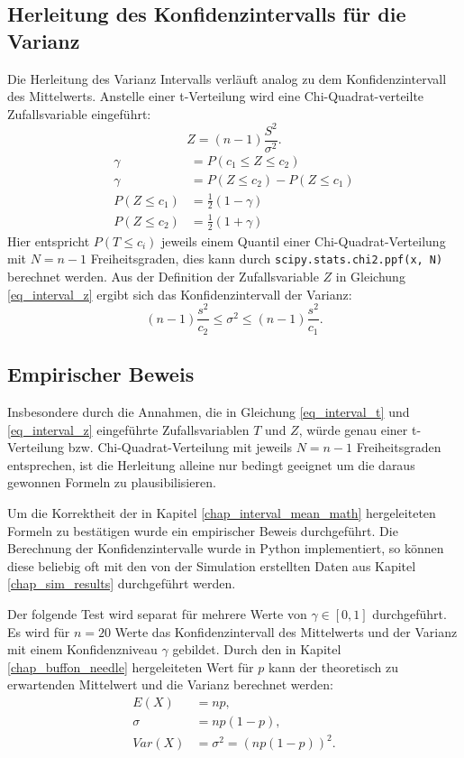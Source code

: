 \documentclass[10pt,twocolumn]{scrartcl}
\begin{document}
	\subsection{Herleitung des Konfidenzintervalls für die Varianz}
		\label{chap_interval_var_math}
		Die Herleitung des Varianz Intervalls verläuft analog zu dem Konfidenzintervall  des Mittelwerts. Anstelle einer t-Verteilung wird eine Chi-Quadrat-verteilte Zufallsvariable eingeführt:
		\begin{equation} \label{eq_interval_z}
		Z = (n-1)\frac{S^2}{\sigma^2} .
		\end{equation}
		\begin{align}
		\gamma &= P(c_1 \le Z \le c_2) \\
		\gamma &= P(Z \le c_2) - P(Z \le c_1) \nonumber \\
		P(Z \le c_1) &= \frac{1}{2} (1-\gamma) \\
		P(Z \le c_2) &= \frac{1}{2} (1+\gamma)
		\end{align}
		Hier entspricht $P(T \le c_i)$ jeweils einem Quantil einer Chi-Quadrat-Verteilung mit $N = n-1$ Freiheitsgraden, dies kann durch \texttt{scipy.stats.chi2.ppf(x, N)}\cite{scipy} berechnet werden.
		Aus der Definition der Zufallsvariable $Z$ in Gleichung \ref{eq_interval_z} ergibt sich das Konfidenzintervall der Varianz:
		\begin{equation}
		(n-1)  \frac{s^2}{c_2} \le \sigma^2 \le (n-1)  \frac{s^2}{c_1}.
		\end{equation}

	\subsection{Empirischer Beweis}
		\label{chap_interval_prove}
		Insbesondere durch die Annahmen, die in Gleichung \ref{eq_interval_t} und \ref{eq_interval_z} eingeführte  Zufallsvariablen $T$ und $Z$, würde genau einer t-Verteilung bzw. Chi-Quadrat-Verteilung mit jeweils $N = n-1$ Freiheitsgraden entsprechen, ist die Herleitung alleine nur bedingt geeignet um die daraus gewonnen Formeln zu plausibilisieren.

		Um die Korrektheit der in Kapitel \ref{chap_interval_mean_math} hergeleiteten Formeln zu bestätigen wurde ein empirischer Beweis durchgeführt. Die Berechnung der Konfidenzintervalle wurde in Python implementiert, so können diese beliebig oft mit den von der Simulation erstellten Daten aus Kapitel \ref{chap_sim_results} durchgeführt werden.

		Der folgende Test wird separat für mehrere Werte von $\gamma \in [0, 1]$ durchgeführt. Es wird für $n = 20$ Werte das Konfidenzintervall des Mittelwerts und der Varianz mit einem Konfidenzniveau $\gamma$ gebildet. Durch den in Kapitel \ref{chap_buffon_needle} hergeleiteten Wert für $p$ kann der theoretisch zu erwartenden Mittelwert und die Varianz berechnet werden:
		\begin{align}
		E(X) &= n p , \\
		\sigma &= n p (1-p) , \nonumber \\
		Var(X) &= \sigma^2 = (n p (1-p))^2 .
		\end{align}
\end{document}
